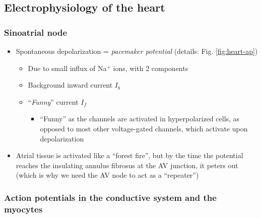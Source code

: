\documentclass[
  12pt,
]{memoir}
\providecommand{\tightlist}{%
  \setlength{\itemsep}{0pt}\setlength{\parskip}{0pt}}
\begin{document}
\hypertarget{electrophysiology-of-the-heart}{%
\subsection{Electrophysiology of the
heart}\label{electrophysiology-of-the-heart}}

\hypertarget{sinoatrial-node}{%
\subsubsection{Sinoatrial node}\label{sinoatrial-node}}

\begin{itemize}
\tightlist
\item
  Spontaneous depolarization = \emph{pacemaker potential} (details: Fig.
  \ref{fig:heart-ap})

  \begin{itemize}
  \tightlist
  \item
    Due to small influx of Na\(^+\) ions, with 2 components
  \item
    Background inward current \(I_b\)
  \item
    ``\emph{Funny}'' current \(I_f\)

    \begin{itemize}
    \tightlist
    \item
      ``Funny'' as the channels are activated in hyperpolarized cells,
      as opposed to most other voltage-gated channels, which activate
      upon depolarization
    \end{itemize}
  \end{itemize}
\item
  Atrial tissue is activated like a ``forest fire'', but by the time the
  potential reaches the insulating annulus fibrosus at the AV junction,
  it peters out (which is why we need the AV node to act as a
  ``repeater'')
\end{itemize}

\pagebreak

\hypertarget{action-potentials-in-the-conductive-system-and-the-myocytes}{%
\subsubsection{Action potentials in the conductive system and the
myocytes}\label{action-potentials-in-the-conductive-system-and-the-myocytes}}
\end{document}
